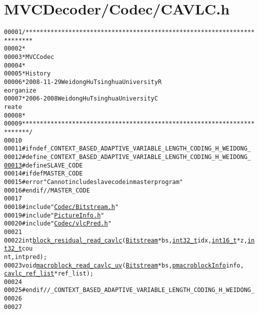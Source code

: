 \hypertarget{_c_a_v_l_c_8h_source}{
\section{MVCDecoder/Codec/CAVLC.h}
}


\begin{footnotesize}\begin{alltt}
00001 \textcolor{comment}{/************************************************************************}
00002 \textcolor{comment}{ *}
00003 \textcolor{comment}{ * MVC Codec}
00004 \textcolor{comment}{ * }
00005 \textcolor{comment}{ * History}
00006 \textcolor{comment}{ * 2008-11-29           Weidong Hu              Tsinghua University             R
      eorganize}
00007 \textcolor{comment}{ * 2006-2008            Weidong Hu              Tsinghua University             C
      reate}
00008 \textcolor{comment}{ * }
00009 \textcolor{comment}{ ************************************************************************/}
00010 
00011 \textcolor{preprocessor}{#ifndef \_CONTEXT\_BASED\_ADAPTIVE\_VARIABLE\_LENGTH\_CODING\_H\_WEIDONG\_}
00012 \textcolor{preprocessor}{}\textcolor{preprocessor}{#define \_CONTEXT\_BASED\_ADAPTIVE\_VARIABLE\_LENGTH\_CODING\_H\_WEIDONG\_}
\hypertarget{_c_a_v_l_c_8h_source_l00013}{}\hyperlink{_c_a_v_l_c_8h_a995f6a4907273b8d56b6543ab1a57d17}{00013} \textcolor{preprocessor}{}\textcolor{preprocessor}{#define SLAVE\_CODE}
00014 \textcolor{preprocessor}{}\textcolor{preprocessor}{#ifdef MASTER\_CODE}
00015 \textcolor{preprocessor}{}\textcolor{preprocessor}{#error "Can not include slave code in master program"}
00016 \textcolor{preprocessor}{}\textcolor{preprocessor}{#endif // MASTER\_CODE}
00017 \textcolor{preprocessor}{}
00018 \textcolor{preprocessor}{#include "\hyperlink{_bitstream_8h}{Codec/Bitstream.h}"}
00019 \textcolor{preprocessor}{#include "\hyperlink{_picture_info_8h}{PictureInfo.h}"}
00020 \textcolor{preprocessor}{#include "\hyperlink{vlc_pred_8h}{Codec/vlcPred.h}"}
00021 
00022 \textcolor{keywordtype}{int} \hyperlink{_c_a_v_l_c_8cpp_aeb5a2ec1c37d4efb405d9209adfb122b}{block_residual_read_cavlc}(\hyperlink{struct_bitstream}{Bitstream} *bs, \hyperlink{_types_8h_a115ba3a1b24a8702355c5dbd61ce01e0}{int32_t} idx, \hyperlink{_types_8h_ae615613535a2b2445773922f5d45a861}{int16_t}* z, \hyperlink{_types_8h_a115ba3a1b24a8702355c5dbd61ce01e0}{int32_t} cou
      nt, \textcolor{keywordtype}{int} pred);
00023 \textcolor{keywordtype}{void} \hyperlink{_c_a_v_l_c_8cpp_ac8715360bdf3222bff81c76624638ec3}{macroblock_read_cavlc_uv}(\hyperlink{struct_bitstream}{Bitstream} *bs, \hyperlink{structmacroblock_info}{pmacroblockInfo} info, 
      \hyperlink{structtag__cavlc__ref__list}{cavlc_ref_list} *ref\_list);
00024 
00025 \textcolor{preprocessor}{#endif //\_CONTEXT\_BASED\_ADAPTIVE\_VARIABLE\_LENGTH\_CODING\_H\_WEIDONG\_}
00026 \textcolor{preprocessor}{}
00027 
\end{alltt}\end{footnotesize}
